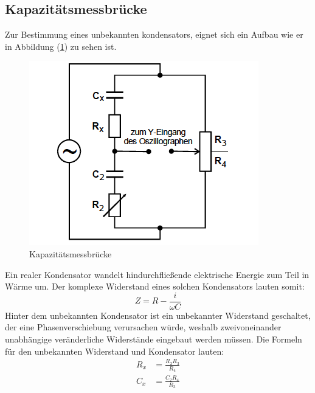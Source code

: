 \subsection{Kapazitätsmessbrücke}
Zur Bestimmung eines unbekannten kondensators, eignet sich ein Aufbau
wie er in Abbildung (\ref{fig:kapa}) zu sehen ist.
\begin{figure}
  \centering
  \includegraphics[scale = 0.7]{Kapa.PNG}
  \caption{Kapazitätsmessbrücke\protect\cite{on3}}
  \label{fig:kapa}
\end{figure}
Ein realer Kondensator wandelt hindurchfließende elektrische Energie zum Teil in Wärme um.
Der komplexe Widerstand eines solchen Kondensators lauten somit:
\begin{equation*}
  Z = R - \frac{i}{\omega C}
\end{equation*}
Hinter dem unbekannten Kondensator ist ein unbekannter Widerstand geschaltet,
der eine Phasenverschiebung verursachen würde,
weshalb zweivoneinander unabhängige veränderliche Widerstände eingebaut werden müssen.
Die Formeln für den unbekannten Widerstand und Kondensator lauten:
\begin{align}
  R_x &= \frac{R_2R_3}{R_4} \\
  C_x &= \frac{C_2R_4}{R_3}
\end{align}

